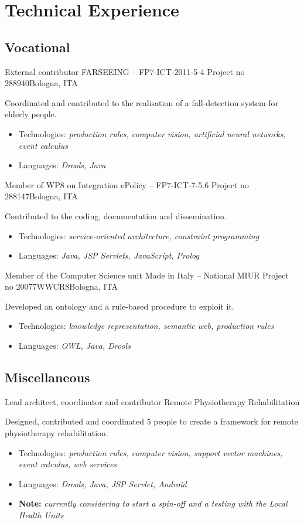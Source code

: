 \section{Technical Experience}
\subsection{Vocational}

%
{External contributor}%
{FARSEEING -- FP7-ICT-2011-5-4 Project no 288940}{Bologna, ITA}{}{Coordinated and contributed to the realisation of a fall\--detection system for elderly people.\begin{itemize}
\item Technologies: \emph{production rules, computer vision, artificial neural networks, event calculus}
\item Languages: \emph{Drools, Java}
\end{itemize}}

%
{Member of WP8 on Integration}%
{ePolicy -- FP7-ICT-7-5.6 Project no 288147}{Bologna, ITA}{}{Contributed to the coding, documentation and dissemination.\begin{itemize}
\item Technologies: \emph{service\--oriented architecture, constraint programming}
\item Languages: \emph{Java, JSP Servlets, JavaScript, Prolog}
\end{itemize}}

%
{Member of the Computer Science unit}%
{Made in Italy -- National MIUR Project no 20077WWCR8}{Bologna, ITA}{}{Developed an ontology and a rule\--based procedure to exploit it.\begin{itemize}
\item Technologies: \emph{knowledge representation, semantic web, production rules}
\item Languages: \emph{OWL, Java, Drools}
\end{itemize}}

\subsection{Miscellaneous}

%
{Lead architect, coordinator and contributor}%
{Remote Physiotherapy Rehabilitation}{}{}{Designed, contributed and coordinated 5 people to create a framework for remote physiotherapy rehabilitation.\begin{itemize}
\item Technologies: \emph{production rules, computer vision, support vector machines, event calculus, web services}
\item Languages: \emph{Drools, Java, JSP Servlet, Android}
\item \textbf{Note:} \emph{currently considering to start a spin\--off and a testing with the Local Health Units}
\end{itemize}}

